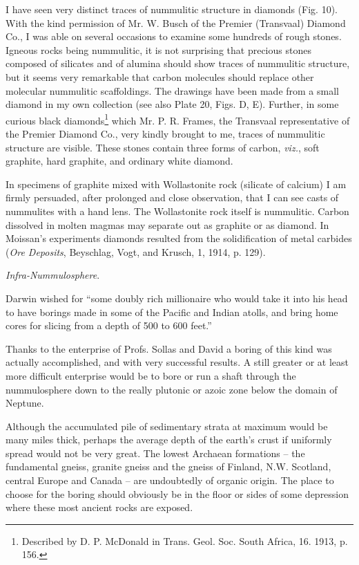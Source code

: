 \documentclass[a4paper, 12pt, oneside]{article}
\begin{document}
I have seen very distinct traces of nummulitic structure in diamonds (Fig. 10). With the kind permission of Mr. W. Busch of the Premier (Transvaal) Diamond Co., I was able on several occasions to examine some hundreds of rough stones. Igneous rocks being nummulitic, it is not surprising that precious stones composed of silicates and of alumina should show traces of nummulitic structure, but it seems very remarkable that carbon molecules should replace other molecular nummulitic scaffoldings. The drawings have been made from a small diamond in my own collection (see also Plate 20, Figs. D, E). Further, in some curious black diamonds\footnote{Described by D. P. McDonald in Trans. Geol. Soc. South Africa, 16. 1913, p. 156.} which Mr. P. R. Frames, the Transvaal representative of the Premier Diamond Co., very kindly brought to me, traces of nummulitic structure are visible. These stones contain three forms of carbon, \emph{viz.}, soft graphite, hard graphite, and ordinary white diamond.

In specimens of graphite mixed with Wollastonite rock (silicate of calcium) I am firmly persuaded, after prolonged and close observation, that I can see casts of nummulites with a hand lens. The Wollastonite rock itself is nummulitic. Carbon dissolved in molten magmas may separate out as graphite or as diamond. In Moissan's experiments diamonds resulted from the solidification of metal carbides (\emph{Ore Deposits}, Beyschlag, Vogt, and Krusch, 1, 1914, p. 129).

\emph{Infra-Nummulosphere}.

Darwin wished for ``some doubly rich millionaire who would take it into his head to have borings made in some of the Pacific and Indian atolls, and bring home cores for slicing from a depth of 500 to 600 feet.''

Thanks to the enterprise of Profs. Sollas and David a boring of this kind was actually accomplished, and with very successful results. A still greater or at least more difficult enterprise would be to bore or run a shaft through the nummulosphere down to the really plutonic or azoic zone below the domain of Neptune.

Although the accumulated pile of sedimentary strata at maximum would be many miles thick, perhaps the average depth of the earth's crust if uniformly spread would not be very great. The lowest Archaean formations -- the fundamental gneiss, granite gneiss and the gneiss of Finland, N.W. Scotland, central Europe and Canada -- are undoubtedly of organic origin. The place to choose for the boring should obviously be in the floor or sides of some depression where these most ancient rocks are exposed.
\end{document}
